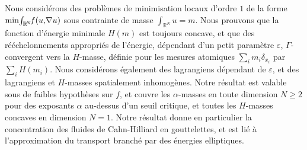 \documentclass[JEP,XML,SOM,Unicode,published]{cedram}
\theoremstyle{plain}
\theoremstyle{definition}
\begin{document}

\begin{altabstract}
Nous considérons des problèmes de minimisation locaux d'ordre $1$ de la forme $\min\mkern-3mu \int_{\mathbb{R}\!^N}\!\!f(u,\!\nabla u)$ sous contrainte de masse $\int_{\mathbb{R}^N}u=m$. Nous prouvons que la fonction d'énergie minimale $H(m)$ est toujours concave, et que des rééchelonnements appropriés de l'énergie, dépendant d'un petit paramètre $\varepsilon$, $\Gamma$-convergent vers la $H$-masse, définie pour les mesures atomiques $\sum_i m_i\delta_{x_i}$ par $\sum_i H(m_i)$. Nous considérons également des lagrangiens dépendant de $\varepsilon$, et des lagrangiens et $H$-masses spatialement inhomogènes. Notre résultat est valable sous de faibles hypothèses sur $f$, et couvre les $\alpha$-masses en toute dimension $N\geq 2$ pour des exposants $\alpha$ au-dessus d'un seuil critique, et toutes les $H$-masses concaves en dimension $N=1$. Notre résultat donne en particulier la concentration des fluides de Cahn-Hilliard en gouttelettes, et est lié à l'approximation du transport branché par des énergies elliptiques.\end{altabstract}

\maketitle
\vspace*{-2\baselineskip}
\tableofcontents
\mainmatter
\end{document}
